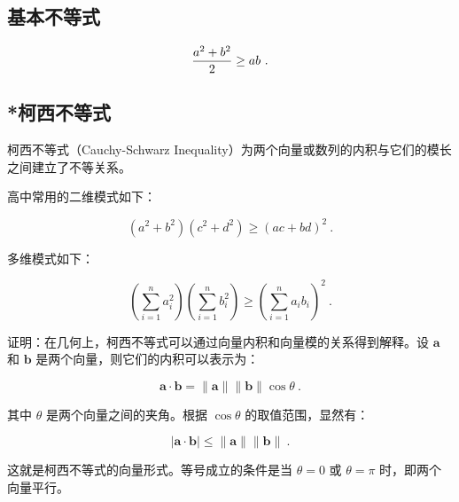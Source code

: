\subsection{基本不等式}

\begin{equation}
{a^2+b^2\over2}\geq ab~.
\end{equation}

\subsection{*柯西不等式}

柯西不等式（Cauchy-Schwarz Inequality）为两个向量或数列的内积与它们的模长之间建立了不等关系。

高中常用的二维模式如下：

\begin{equation}
\left( a^2 + b^2\right) \left(c^2 + d^2 \right) \geq \left( ac+bd \right)^2~.
\end{equation}

多维模式如下：

\begin{equation}
\left( \sum_{i=1}^{n} a_i^2 \right) \left( \sum_{i=1}^{n} b_i^2 \right) \geq \left( \sum_{i=1}^{n} a_i b_i \right)^2~.
\end{equation}

证明：在几何上，柯西不等式可以通过向量内积和向量模的关系得到解释。设 $\mathbf{a}$ 和 $\mathbf{b}$ 是两个向量，则它们的内积可以表示为：

$$\mathbf{a} \cdot \mathbf{b} = \|\mathbf{a}\| \|\mathbf{b}\| \cos \theta~.$$

其中 $\theta$ 是两个向量之间的夹角。根据 $\cos \theta$ 的取值范围，显然有：

$$|\mathbf{a} \cdot \mathbf{b}| \leq \|\mathbf{a}\| \|\mathbf{b}\|~.$$

这就是柯西不等式的向量形式。等号成立的条件是当 $\theta = 0$ 或 $\theta = \pi$ 时，即两个向量平行。
